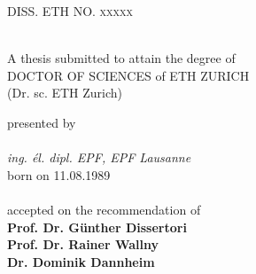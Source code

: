 
\begin{titlepage}

\newcommand{\HRule}{\rule{\linewidth}{0.5mm}} %

\center %
 

\textsc{\LARGE DISS. ETH NO. xxxxx}\\[1.5cm] %

\vspace{2cm}
{ \huge \bfseries \thesistitle}\\[0.4cm] %
\vspace{2cm}

{\large A thesis submitted to attain the degree of} \\ \vspace{0.5cm}
{\Large DOCTOR OF SCIENCES of ETH ZURICH}\\ \vspace{0.3cm}
{\Large (Dr. sc. ETH Zurich)} \vspace{1.5cm}


{\large presented by} \\ \vspace{0.3cm}
{\Large \thesisauthor}\\ \vspace{1cm}
{\Large \textit{ing. \'{e}l. dipl. EPF, EPF Lausanne}}\\ \vspace{1cm}
{\Large born on 11.08.1989} \\
{\Large \thesistown}\\ \vspace{2cm}
{\large accepted on the recommendation of} \\ \vspace{0.5cm}
{\Large \textbf{Prof. Dr. G\"{u}nther Dissertori}} \\
{\Large \textbf{Prof. Dr. Rainer Wallny}} \\
{\Large \textbf{Dr. Dominik Dannheim}} \\ \vspace{1cm}


\end{titlepage}
